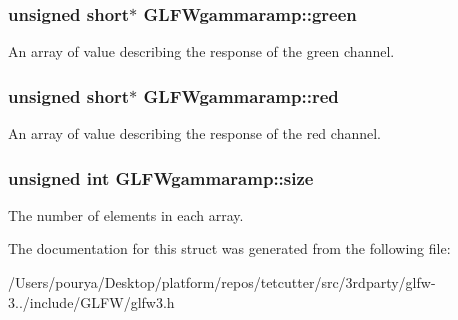 \subsubsection[{green}]{\setlength{\rightskip}{0pt plus 5cm}unsigned short$\ast$ G\+L\+F\+Wgammaramp\+::green}\label{structGLFWgammaramp_affccc6f5df47820b6562d709da3a5a3a}
An array of value describing the response of the green channel. \hypertarget{structGLFWgammaramp_a2cce5d968734b685623eef913e635138}{}
\subsubsection[{red}]{\setlength{\rightskip}{0pt plus 5cm}unsigned short$\ast$ G\+L\+F\+Wgammaramp\+::red}\label{structGLFWgammaramp_a2cce5d968734b685623eef913e635138}
An array of value describing the response of the red channel. \hypertarget{structGLFWgammaramp_ad620e1cffbff9a32c51bca46301b59a5}{}
\subsubsection[{size}]{\setlength{\rightskip}{0pt plus 5cm}unsigned int G\+L\+F\+Wgammaramp\+::size}\label{structGLFWgammaramp_ad620e1cffbff9a32c51bca46301b59a5}
The number of elements in each array. 

The documentation for this struct was generated from the following file\+:\begin{DoxyCompactItemize}
\item 
/\+Users/pourya/\+Desktop/platform/repos/tetcutter/src/3rdparty/glfw-\/3../include/\+G\+L\+F\+W/glfw3.\+h\end{DoxyCompactItemize}
